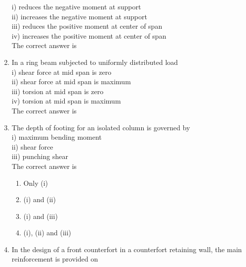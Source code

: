 \documentclass[11pt,a4paper]{article}
\begin{document}
\begin{enumerate}
{i) reduces the negative moment at support \\
ii) increases the negative moment at support \\
iii) reduces the positive moment at center of span \\
iv) increases the positive moment at center of span  \\
The correct answer is}
\\
\item{In a ring beam subjected to uniformly distributed load \\
i) shear force at mid span is zero \\
ii) shear force at mid span is maximum \\
iii) torsion at mid span is zero \\
iv) torsion at mid span is maximum  \\
The correct answer is}
\\
\item{The depth of footing for an isolated column is governed by \\
i) maximum bending moment \\
ii) shear force \\
iii) punching shear  \\
The correct answer is}
\begin{enumerate}[label=\Alph*.]
\item{Only (i)}
\item{(i) and (ii)}
\item{(i) and (iii)}
\item{(i), (ii) and (iii)}
\end{enumerate}
\item{In the design of a front counterfort in a counterfort retaining wall, the main reinforcement is provided on \\
}
\end{enumerate}
\end{document}
